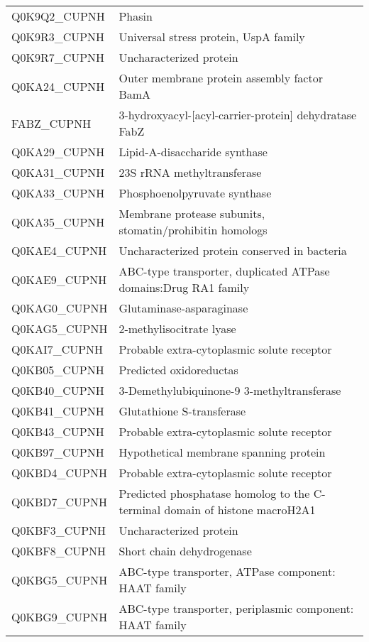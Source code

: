 \begin{center}
\begin{longtable}{ l l }
Q0K9Q2\_CUPNH & Phasin \\ [0.5ex]
Q0K9R3\_CUPNH & Universal stress protein, UspA family \\ [0.5ex]
Q0K9R7\_CUPNH & Uncharacterized protein \\ [0.5ex]
Q0KA24\_CUPNH & Outer membrane protein assembly factor BamA \\ [0.5ex]
FABZ\_CUPNH & 3-hydroxyacyl-[acyl-carrier-protein] dehydratase FabZ \\ [0.5ex]
Q0KA29\_CUPNH & Lipid-A-disaccharide synthase \\ [0.5ex]
Q0KA31\_CUPNH & 23S rRNA methyltransferase \\ [0.5ex]
Q0KA33\_CUPNH & Phosphoenolpyruvate synthase \\ [0.5ex]
Q0KA35\_CUPNH & Membrane protease subunits, stomatin/prohibitin homologs \\ [0.5ex]
Q0KAE4\_CUPNH & Uncharacterized protein conserved in bacteria \\ [0.5ex]
Q0KAE9\_CUPNH & ABC-type transporter, duplicated ATPase domains:Drug RA1 family \\ [0.5ex]
Q0KAG0\_CUPNH & Glutaminase-asparaginase \\ [0.5ex]
Q0KAG5\_CUPNH & 2-methylisocitrate lyase \\ [0.5ex]
Q0KAI7\_CUPNH & Probable extra-cytoplasmic solute receptor \\ [0.5ex]
Q0KB05\_CUPNH & Predicted oxidoreductas \\ [0.5ex]
Q0KB40\_CUPNH & 3-Demethylubiquinone-9 3-methyltransferase \\ [0.5ex]
Q0KB41\_CUPNH & Glutathione S-transferase \\ [0.5ex]
Q0KB43\_CUPNH & Probable extra-cytoplasmic solute receptor \\ [0.5ex]
Q0KB97\_CUPNH & Hypothetical membrane spanning protein \\ [0.5ex]
Q0KBD4\_CUPNH & Probable extra-cytoplasmic solute receptor \\ [0.5ex]
Q0KBD7\_CUPNH & Predicted phosphatase homolog to the C-terminal domain of histone macroH2A1 \\ [0.5ex]
Q0KBF3\_CUPNH & Uncharacterized protein \\ [0.5ex]
Q0KBF8\_CUPNH & Short chain dehydrogenase \\ [0.5ex]
Q0KBG5\_CUPNH & ABC-type transporter, ATPase component: HAAT family \\ [0.5ex]
Q0KBG9\_CUPNH & ABC-type transporter, periplasmic component: HAAT family \\ [0.5ex]

\end{longtable}
\end{center}
